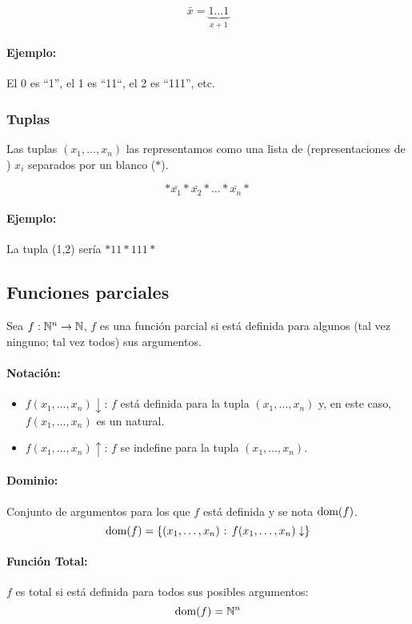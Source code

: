 	$$\bar{x} = \underbrace{1...1}_{x+1}$$
	
	\paragraph{Ejemplo:} El 0 es ``1'', el 1 es ``11``, el 2 es ``111'', etc.
	
	\subsubsection{Tuplas}
	Las tuplas $(x_1,\dots,x_n)$ las representamos como una lista de (representaciones de ) $x_i$ separados por un blanco ($*$).
	
	$$*\bar{x_1}*\bar{x_2}*\dots*\bar{x_n}*$$
	
	\paragraph{Ejemplo:} La tupla (1,2) sería $*11*111*$
	\subsection{Funciones parciales}
	Sea $f:\mathbb{N}^n\to\mathbb{N}$, $f$ es una función parcial si está definida para algunos (tal vez ninguno; tal vez todos) sus argumentos. 
	
	\paragraph{Notación:}
	\begin{itemize}
		\item $f(x_1,\dots,x_n)\downarrow$: $f$ está definida para la tupla $(x_1,\dots,x_n)$ y, en este caso, $f(x_1,\dots,x_n)$ es un natural.
		\item $f(x_1,\dots,x_n)\uparrow$: $f$ se indefine para la tupla $(x_1,\dots,x_n)$.
	\end{itemize}

	\paragraph{Dominio:} Conjunto de argumentos para los que $f$ está definida y se nota $\text{dom}(f)$.
	$$\text{dom}(f) = \{(x_1,\dots,x_n) \text{ : } f(x_1,\dots,x_n)\downarrow\}$$ 
	
	\paragraph{Función Total:} $f$ es total si está definida para todos sus posibles argumentos:
	$$\text{dom}(f) = \mathbb{N}^n$$
	

